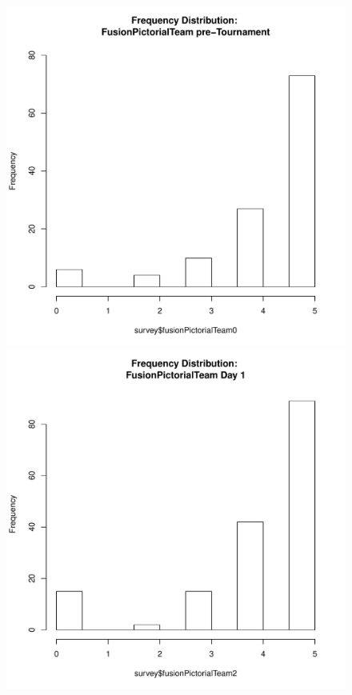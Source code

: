 \documentclass[12pt]{report}
\begin{document}
{%
\begin{figure}[htbp]
  \includegraphics[scale =.4]{../images/distFusionPictorialTeamPre.pdf}
  \includegraphics[scale =.4]{../images/distFusionPictorialTeamDay1.pdf}

\end{figure}}
\end{document}
